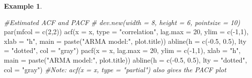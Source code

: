 \documentclass[
]{book}
\newenvironment{Shaded}{\begin{snugshade}}{\end{snugshade}}
\newcommand{\AttributeTok}[1]{\textcolor[rgb]{0.77,0.63,0.00}{#1}}
\newcommand{\CommentTok}[1]{\textcolor[rgb]{0.56,0.35,0.01}{\textit{#1}}}
\newcommand{\DecValTok}[1]{\textcolor[rgb]{0.00,0.00,0.81}{#1}}
\newcommand{\FloatTok}[1]{\textcolor[rgb]{0.00,0.00,0.81}{#1}}
\newcommand{\FunctionTok}[1]{\textcolor[rgb]{0.00,0.00,0.00}{#1}}
\newcommand{\NormalTok}[1]{#1}
\newcommand{\SpecialCharTok}[1]{\textcolor[rgb]{0.00,0.00,0.00}{#1}}
\newcommand{\StringTok}[1]{\textcolor[rgb]{0.31,0.60,0.02}{#1}}
\theoremstyle{definition}
\theoremstyle{definition}
\newtheorem{example}{Example}[chapter]
\theoremstyle{definition}
\theoremstyle{definition}
\theoremstyle{remark}
\begin{document}
\begin{example}
\begin{Shaded}
\begin{Highlighting}[]
 \CommentTok{\#Estimated ACF and PACF}
  \CommentTok{\# dev.new(width = 8, height = 6, pointsize = 10)}
  \FunctionTok{par}\NormalTok{(}\AttributeTok{mfcol =} \FunctionTok{c}\NormalTok{(}\DecValTok{2}\NormalTok{,}\DecValTok{2}\NormalTok{))}
  \FunctionTok{acf}\NormalTok{(}\AttributeTok{x =}\NormalTok{ x, }\AttributeTok{type =} \StringTok{"correlation"}\NormalTok{, }\AttributeTok{lag.max =} \DecValTok{20}\NormalTok{, }\AttributeTok{ylim =} \FunctionTok{c}\NormalTok{(}\SpecialCharTok{{-}}\DecValTok{1}\NormalTok{,}\DecValTok{1}\NormalTok{), }\AttributeTok{xlab =} \StringTok{"h"}\NormalTok{,}
    \AttributeTok{main =} \FunctionTok{paste}\NormalTok{(}\StringTok{"ARMA model:"}\NormalTok{, plot.title))}
  \FunctionTok{abline}\NormalTok{(}\AttributeTok{h =} \FunctionTok{c}\NormalTok{(}\SpecialCharTok{{-}}\FloatTok{0.5}\NormalTok{, }\FloatTok{0.5}\NormalTok{), }\AttributeTok{lty =} \StringTok{"dotted"}\NormalTok{, }\AttributeTok{col =} \StringTok{"gray"}\NormalTok{)}
  \FunctionTok{pacf}\NormalTok{(}\AttributeTok{x =}\NormalTok{ x, }\AttributeTok{lag.max =} \DecValTok{20}\NormalTok{, }\AttributeTok{ylim =} \FunctionTok{c}\NormalTok{(}\SpecialCharTok{{-}}\DecValTok{1}\NormalTok{,}\DecValTok{1}\NormalTok{), }\AttributeTok{xlab =} \StringTok{"h"}\NormalTok{,}
    \AttributeTok{main =} \FunctionTok{paste}\NormalTok{(}\StringTok{"ARMA model:"}\NormalTok{, plot.title))}
  \FunctionTok{abline}\NormalTok{(}\AttributeTok{h =} \FunctionTok{c}\NormalTok{(}\SpecialCharTok{{-}}\FloatTok{0.5}\NormalTok{, }\FloatTok{0.5}\NormalTok{), }\AttributeTok{lty =} \StringTok{"dotted"}\NormalTok{, }\AttributeTok{col =} \StringTok{"gray"}\NormalTok{)}
  \CommentTok{\#Note: acf(x = x, type = "partial") also gives the PACF plot}
  

\end{Highlighting}
\end{Shaded}
\end{example}
\end{document}
